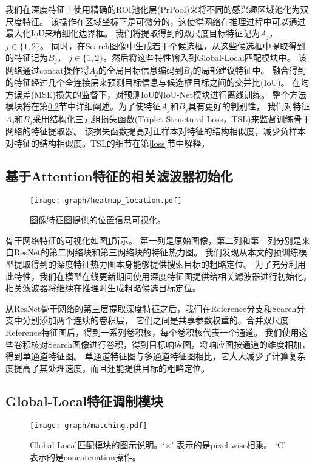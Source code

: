 \documentclass[promaster]{thesis-uestc}
\begin{document}
我们在深度特征上使用精确的ROI池化层(PrPool)\cite{prpool}来将不同的感兴趣区域池化为双尺度特征。
该操作在区域坐标下是可微分的，这使得网络在推理过程中可以通过最大化IoU来精细化边界框。
我们将提取得到的双尺度目标特征记为$A_{j}$， $j \in \{1,2\}$。
同时，在Search图像中生成若干个候选框，从这些候选框中提取得到的特征记为$B_{j}$，
$j \in \{1,2\}$。然后将这些特性输入到Global-Local匹配模块中。
该网络通过concat操作将$A_{j}$的全局目标信息编码到$B_{j}$的局部建议特征中。
融合得到的特征经过几个全连接层来预测目标信息与候选框目标之间的交并比(IoU)。
在均方误差(MSE)损失的监督下，对预测IoU的IoU-Net模块进行离线训练。
整个方法模块将在第\ref{amm}节中详细阐述。为了使特征$A_{j}$和$B_{j}$具有更好的判别性，
我们对特征$A_{j}$和$B_{j}$采用结构化三元组损失函数(Triplet Structural Loss，TSL)来监督训练骨干网络的特征提取器。
该损失函数提高对正样本对特征的结构相似度，减少负样本对特征的结构相似度。TSL的细节在第\ref{loss}节中解释。

\subsection{基于Attention特征的相关滤波器初始化}
\begin{figure}[htp]
    \centering
    \texttt{[image: graph/heatmap\_location.pdf]}
    \caption{图像特征图提供的位置信息可视化。}
    \label{heatmap_location}
\end{figure}
骨干网络特征的可视化如图\ref{heatmap_location}所示。
第一列是原始图像，第二列和第三列分别是来自ResNet\cite{resnet}的第二网络块和第三网络块的特征热力图。
我们发现从本文的预训练模型提取得到的深度特征热力图本身能够提供搜索目标的粗略定位。 
为了充分利用此特性，我们在模型在线更新期间使用深度特征图提供给相关滤波器进行初始化，
相关滤波器将继续在推理时生成粗略候选目标定位。

从ResNet骨干网络的第三层提取深度特征之后，我们在Reference分支和Search分支中分别添加两个连续的卷积层，
它们之间是共享参数权重的。合并双尺度Reference特征图后，得到一系列卷积核，每个卷积核代表一个通道。 
我们使用这些卷积核对Search图像进行卷积，得到目标响应图，将响应图按通道的维度相加，得到单通道特征图。 
单通道特征图与多通道特征图相比，它大大减少了计算复杂度提高了其处理速度，而且还能提供目标的粗略定位。



\subsection{Global-Local特征调制模块}
\label{amm}
\begin{figure}[htp]
    \begin{center}
    \texttt{[image: graph/matching.pdf]}
    \end{center}
       \caption{Global-Local匹配模块的图示说明。‘$\times$’ 表示的是pixel-wise相乘。
       ‘C’ 表示的是concatenation操作。}
    \label{fig:3}
\end{figure}
\end{document}
